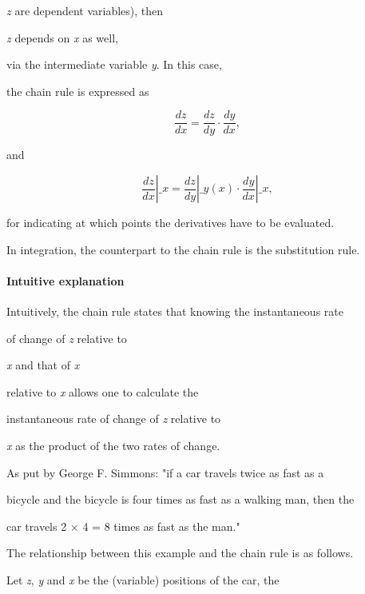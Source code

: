 {\textit{z} are dependent variables), then

\textit{z} depends on \textit{x} as well,

via the intermediate variable \textit{y}. In this case,

the chain rule is expressed as



$$\frac{dz}{dx} = \frac{dz}{dy} \cdot \frac{dy}{dx},$$



and



$$\left.\frac{dz}{dx}\right|\_{x} = \left.\frac{dz}{dy}\right|\_{y(x)}

\cdot \left. \frac{dy}{dx}\right|\_{x} ,$$



for indicating at which points the derivatives have to be evaluated.



In integration, the counterpart to the chain rule is the substitution rule.



\paragraph{Intuitive explanation}



Intuitively, the chain rule states that knowing the instantaneous rate

of change of \textit{z} relative to

\textit{x} and that of \textit{x}

relative to \textit{x} allows one to calculate the

instantaneous rate of change of \textit{z} relative to

\textit{x} as the product of the two rates of change.



As put by George F. Simmons: "if a car travels twice as fast as a

bicycle and the bicycle is four times as fast as a walking man, then the

car travels 2 × 4 = 8 times as fast as the man."



The relationship between this example and the chain rule is as follows.

Let \textit{z}, \textit{y} and \textit{x} be the (variable) positions of the car, the

}
